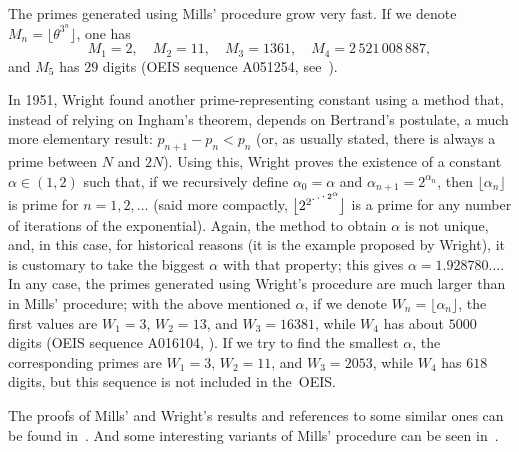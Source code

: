 \documentclass{article}
\theoremstyle{plain}
\begin{document}
The primes generated using Mills' procedure grow very fast. If we denote $M_n = \lfloor \theta^{3^n} \rfloor$, one has
\[
  M_1 = 2,\quad M_2 = 11,\quad M_3 = 1361,\quad M_4 = 2\,521\,008\,887,
\] 
and $M_5$ has $29$ digits (OEIS sequence A051254, see~\cite{OEIS-Mi}).

In 1951, Wright \cite{Wr} found another prime-representing constant using a method that, instead of relying on Ingham's theorem, depends on Bertrand's postulate, a much more elementary result: $p_{n+1}-p_n < p_n$ (or, as usually stated, there is always a prime between $N$ and $2N$). Using this, Wright proves the existence of a constant $\alpha \in (1, 2)$ such that, if we recursively define $\alpha_0 = \alpha$ and $\alpha_{n+1} = 2^{\alpha_n}$, then $\lfloor \alpha_n \rfloor$ is prime for $n= 1,2,\dots$ 
(said more compactly, 
$\big\lfloor 2^{2^{\rotatebox{15}{\footnotesize\dots}^{\raisebox{-0.7pt}{$\scriptscriptstyle 2^\alpha$}}}} \!\big\rfloor$ 
is a prime for any number of iterations of the exponential).
Again, the method to obtain $\alpha$ is not unique, and, in this case, for historical reasons (it is the example proposed by Wright), it is customary to take the biggest $\alpha$ with that property; this gives $\alpha = 1.928780\dots$. 
In any case, the primes generated using Wright's procedure are much larger than in Mills' procedure;
with the above mentioned $\alpha$, if we denote $W_n = \lfloor \alpha_n \rfloor$, the first values are 
$W_1 = 3$, $W_2 = 13$, and $W_3 = 16381$, while $W_4$ has about $5000$ digits (OEIS sequence A016104, \cite{OEIS-Wr}).
If we try to find the smallest $\alpha$, the corresponding primes are $W_1 = 3$, $W_2 = 11$, and $W_3 = 2053$, while $W_4$ has $618$ digits, but this sequence is not included in the~OEIS.

The proofs of Mills' and Wright's results and references to some similar ones can be found in~\cite{Du}.
And some interesting variants of Mills' procedure can be seen in~\cite{El}.
\end{document}
